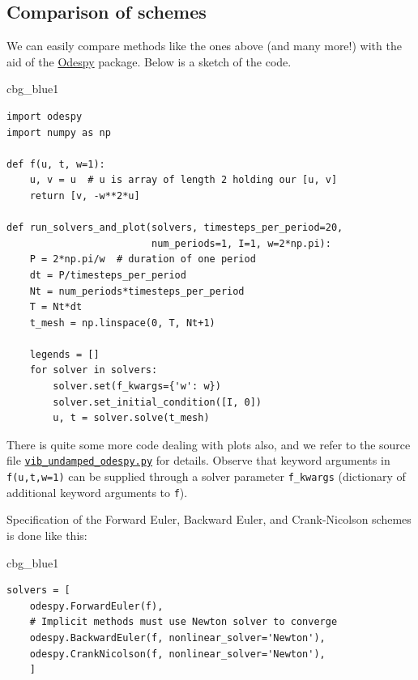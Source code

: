\documentclass[%
oneside,                 %
final,                   %
10pt]{article}
\newenvironment{_cod_tight}[1]{
   \def\FrameCommand{\colorbox{#1}}
   \FrameRule0.6pt\MakeFramed {\FrameRestore}\vskip3mm}
   {\vskip0mm\endMakeFramed}
\newenvironment{cod}[1]{
\bgroup\rmfamily
\fboxsep=0mm\relax
\begin{_cod_tight}{#1}
\list{}{\parsep=-2mm\parskip=0mm\topsep=0pt\leftmargin=2mm
\rightmargin=2\leftmargin\leftmargin=4pt\relax}
\item\relax}
{\endlist\end{_cod_tight}\egroup}
\begin{document}
\subsection{Comparison of schemes}
\label{vib:model2x2:compare}

We can easily compare methods like the ones above (and many more!)
with the aid of the
\href{{https://github.com/hplgit/odespy}}{Odespy} package. Below is
a sketch of the code.

\begin{cod}{cbg_blue1}\begin{Verbatim}[numbers=none,fontsize=\fontsize{9pt}{9pt},baselinestretch=0.95,xleftmargin=2mm]
import odespy
import numpy as np

def f(u, t, w=1):
    u, v = u  # u is array of length 2 holding our [u, v]
    return [v, -w**2*u]

def run_solvers_and_plot(solvers, timesteps_per_period=20,
                         num_periods=1, I=1, w=2*np.pi):
    P = 2*np.pi/w  # duration of one period
    dt = P/timesteps_per_period
    Nt = num_periods*timesteps_per_period
    T = Nt*dt
    t_mesh = np.linspace(0, T, Nt+1)

    legends = []
    for solver in solvers:
        solver.set(f_kwargs={'w': w})
        solver.set_initial_condition([I, 0])
        u, t = solver.solve(t_mesh)
\end{Verbatim}
\end{cod}
\noindent
There is quite some more code dealing with plots also, and we refer
to the source file \href{{http://tinyurl.com/nm5587k/vib/vib_undamped_odespy.py}}{\nolinkurl{vib_undamped_odespy.py}}
for details. Observe that keyword arguments in \texttt{f(u,t,w=1)} can
be supplied through a solver parameter \Verb!f_kwargs! (dictionary of
additional keyword arguments to \texttt{f}).

Specification of the Forward Euler, Backward Euler, and
Crank-Nicolson schemes is done like this:

\begin{cod}{cbg_blue1}\begin{Verbatim}[numbers=none,fontsize=\fontsize{9pt}{9pt},baselinestretch=0.95,xleftmargin=2mm]
solvers = [
    odespy.ForwardEuler(f),
    # Implicit methods must use Newton solver to converge
    odespy.BackwardEuler(f, nonlinear_solver='Newton'),
    odespy.CrankNicolson(f, nonlinear_solver='Newton'),
    ]
\end{Verbatim}
\end{cod}
\noindent
\end{document}
